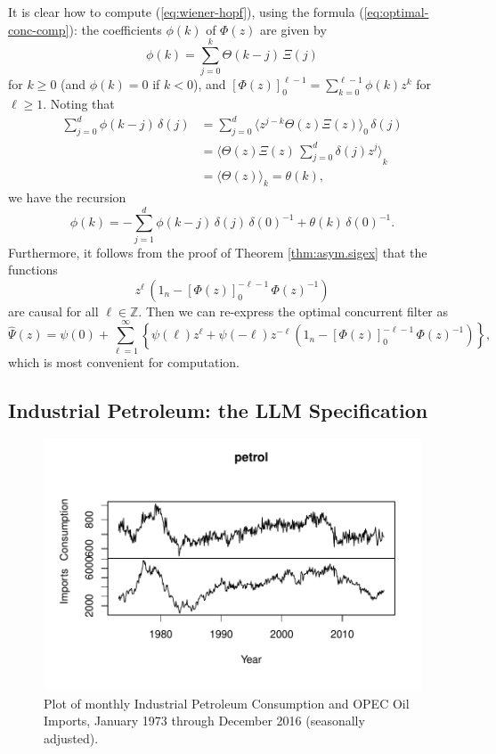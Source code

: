 \documentclass[a4paper]{book}
\def\ZZ{\mathbb Z}
\begin{document}
\vspace{.5cm}

 It is   clear how to compute (\ref{eq:wiener-hopf}), using the formula
 (\ref{eq:optimal-conc-comp}):
 the coefficients $\phi (k)$ of $\Phi (z)$ are given by
\[
 \phi (k) = \sum_{j=0}^k \Theta (k-j) \, \Xi (j)
\]
 for $k \geq 0$  (and $\phi (k) = 0 $ if $k < 0$), and 
 ${ [  \Phi (z) ]}_0^{\ell-1} = \sum_{k=0}^{\ell-1} \phi (k) z^k$ for $\ell \geq 1$.
  Noting that
\begin{align*}
  \sum_{j=0}^d \phi (k-j) \, \delta (j) & =
   \sum_{j=0}^d { \langle z^{j-k} \Theta (z) \Xi (z) \rangle}_0 \, \delta (j) \\
  & =  { \langle   \Theta (z) \Xi (z)  \, \sum_{j=0}^d \delta (j) z^j \rangle}_k \\
 &   = { \langle \Theta (z) \rangle}_k = \theta (k),
\end{align*}
 we have the recursion
\[
  \phi (k) = - \sum_{j=1}^d \phi (k-j) \, \delta (j) \, { \delta (0)}^{-1} 
    + \theta (k) \, { \delta (0)}^{-1}.
\]
 Furthermore, it follows from the proof of Theorem \ref{thm:asym.sigex} that the functions
\[
  z^{\ell}  \, \left( 1_n -  { [  \Phi (z) ]}_0^{-\ell-1} \, { \Phi (z) }^{-1} \right)
\]
are causal for all $\ell \in \ZZ$.  Then we can re-express the optimal concurrent filter as
\[
 \widehat{\Psi} (z) = \psi (0) + \sum_{\ell=1}^{\infty} 
 \left\{ \psi (\ell) z^{\ell} + \psi (-\ell) z^{-\ell} 
 \left( 1_n -  { [  \Phi (z) ]}_0^{-\ell-1} \, { \Phi (z) }^{-1} \right) \right\},
\]
 which is most convenient for computation.

\subsection{Industrial Petroleum: the LLM Specification}


  
\begin{figure}[htb!]
\begin{center}
\includegraphics[]{petrol_data.pdf}
\caption{Plot of monthly  Industrial Petroleum Consumption and OPEC Oil Imports, 
  January 1973 through December 2016 (seasonally adjusted). }
\label{fig:petroldata}
\end{center}
\end{figure}  
\end{document}
